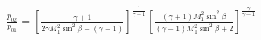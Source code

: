 \documentclass[10pt]{article}
\begin{document}
\begin{align*}\frac{p_{02}}{p_{01}}
=
\left[
\frac{\gamma + 1}{2 \gamma M_{1}^{2} \sin^2 \beta - \left( \gamma -1 \right) }
\right]^{\frac{1}{\gamma-1} }
\left[ 
\frac{ \left( \gamma + 1 \right) M_{1}^{2} \sin^2 \beta }{ \left( \gamma -1 \right) M_{1}^{2} \sin^2 \beta + 2 }
\right]^{\frac{\gamma}{\gamma-1}}\end{align*}
\end{document}
